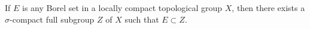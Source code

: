 If $E$ is any Borel set in a locally compact topological group $X$, then there exists a $\sigma$-compact full subgroup $Z$ of $X$ such that $E \subset Z$.
